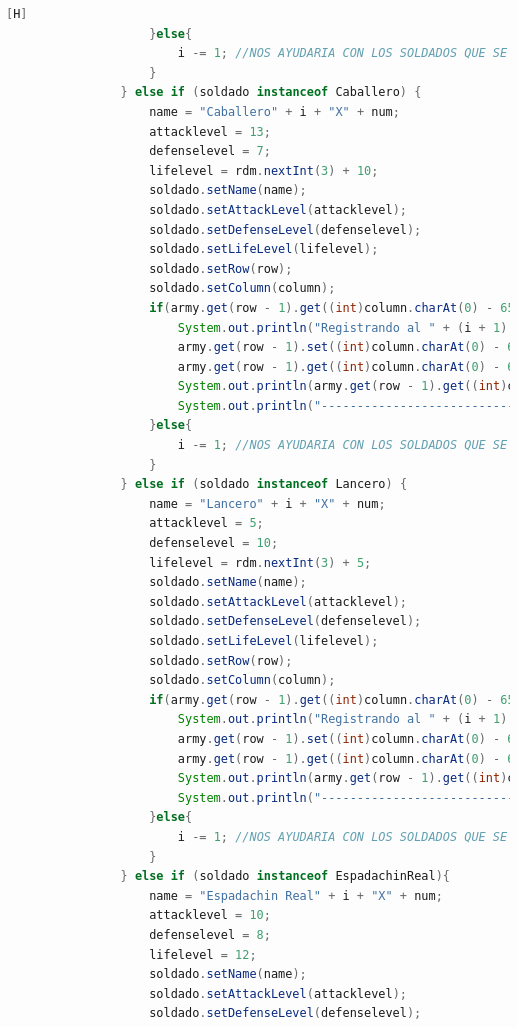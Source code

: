 \documentclass{article}
\begin{document}
\begin{lstlisting}[language=java,caption={Las lineas de codigos de la clase Mapa}][H]
					}else{
						i -= 1; //NOS AYUDARIA CON LOS SOLDADOS QUE SE REPITEN EN EL MISMO CASILLERO CON TAL QUE NO DEBERIA CONTAR 
					}
				} else if (soldado instanceof Caballero) {
					name = "Caballero" + i + "X" + num; 
					attacklevel = 13;
					defenselevel = 7;
					lifelevel = rdm.nextInt(3) + 10; 
					soldado.setName(name);                  
					soldado.setAttackLevel(attacklevel);
					soldado.setDefenseLevel(defenselevel);                    
					soldado.setLifeLevel(lifelevel);
					soldado.setRow(row);
					soldado.setColumn(column);
					if(army.get(row - 1).get((int)column.charAt(0) - 65) == null){
						System.out.println("Registrando al " + (i + 1) + " soldado del Ejercito " + armyespe + "");
						army.get(row - 1).set((int)column.charAt(0) - 65, new Caballero(name, attacklevel, defenselevel, lifelevel, speed, "Caballero", true, row, column, false));
						army.get(row - 1).get((int)column.charAt(0) - 65).setSpeed(speed);
						System.out.println(army.get(row - 1).get((int)column.charAt(0) - 65).toString());
						System.out.println("---------------------------------");
					}else{
						i -= 1; //NOS AYUDARIA CON LOS SOLDADOS QUE SE REPITEN EN EL MISMO CASILLERO CON TAL QUE NO DEBERIA CONTAR 
					}
				} else if (soldado instanceof Lancero) {
					name = "Lancero" + i + "X" + num; 
					attacklevel = 5;
					defenselevel = 10;
					lifelevel = rdm.nextInt(3) + 5;
					soldado.setName(name);                  
					soldado.setAttackLevel(attacklevel);
					soldado.setDefenseLevel(defenselevel);                    
					soldado.setLifeLevel(lifelevel);
					soldado.setRow(row);
					soldado.setColumn(column);
					if(army.get(row - 1).get((int)column.charAt(0) - 65) == null){
						System.out.println("Registrando al " + (i + 1) + " soldado del Ejercito " + armyespe + "");
						army.get(row - 1).set((int)column.charAt(0) - 65, new Lancero(name, attacklevel, defenselevel, lifelevel, speed, "Lancero", true, row, column, attacklevel));
						army.get(row - 1).get((int)column.charAt(0) - 65).setSpeed(speed);
						System.out.println(army.get(row - 1).get((int)column.charAt(0) - 65).toString());
						System.out.println("---------------------------------");
					}else{
						i -= 1; //NOS AYUDARIA CON LOS SOLDADOS QUE SE REPITEN EN EL MISMO CASILLERO CON TAL QUE NO DEBERIA CONTAR 
					}
				} else if (soldado instanceof EspadachinReal){
					name = "Espadachin Real" + i + "X" + num;
					attacklevel = 10;
					defenselevel = 8;
					lifelevel = 12;
					soldado.setName(name);                  
					soldado.setAttackLevel(attacklevel);
					soldado.setDefenseLevel(defenselevel);                    

\end{lstlisting}
\end{document}
